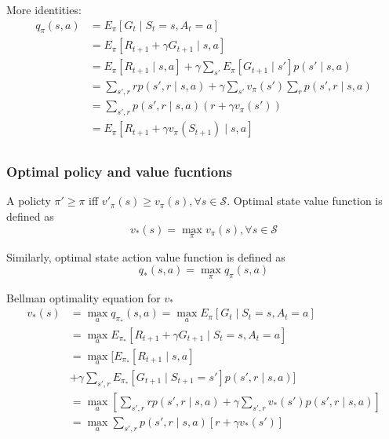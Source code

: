 \documentclass[twocolumn, 10pt]{article}
\newcommand{\stateset}{\mathcal{S}}
\begin{document}
More identities:
$$
\begin{aligned}
 q_{\pi}(s, a) &= E_{\pi} [G_t \mid S_t = s, A_t = a]  \\
 					   &= E_{\pi} [R_{t+1} + \gamma G_{t+1} \mid  s,  a] \\
                       &=   E_{\pi} [R_{t+1} \mid s, a] + \gamma \sum_{s'} E_{\pi}  [G_{t+1} \mid s'] p(s' \mid s, a) \\
                       &=  \sum_{s', r}  r p(s', r  \mid s, a) + \gamma \sum_{s' } v_{\pi}(s')   \sum_{r} p(s', r \mid s, a) \\
                       &=  \sum_{s', r} p(s', r  \mid s, a)  ( r  + \gamma  v_{\pi}(s') ) \\
                       &=   E_{\pi} [R_{t+1}  + \gamma  v_{\pi}(S_{t+1}) \mid s, a] \\
\end{aligned}
$$

\subsubsection*{Optimal policy and value fucntions}

 A policty $\pi' \geq \pi$ iff  $v'_{\pi}(s) \geq v_{\pi}(s), \forall s \in \stateset$. Optimal state value function is defined as $$v_*(s) = \max_{\pi} v_{\pi}(s),  \forall s \in \stateset$$
 
 Similarly,  optimal state action value function is defined as $$ q_*(s, a) = \max_{\pi} q_{\pi}(s, a) $$
   
 Bellman optimality equation for $v_*$  
 $$
\begin{aligned}
v_*(s) & = \max_{a} q_{\pi_*}(s, a) =\max_a E_{\pi} [G_t \mid S_t = s, A_t = a] \\
            & = \max_{a} E_{\pi_*} [R_{t+ 1} + \gamma G_{t+1} \mid S_t = s, A_t = a] \\
            & = \max_{a} [  E_{\pi_*} [R_{t+ 1}  \mid s, a ]  \\
            & + \gamma   \sum_{s', r}  E_{\pi_*} [G_{t+1}  \mid S_{t+1} = s']p(s', r \mid  s, a)]  \\
            & = \max_{a} \left[  \sum_{s', r} r p(s', r \mid s, a)   + \gamma   \sum_{s', r}  v_*(s')p(s', r \mid  s, a) \right]  \\
            & = \max_{a} \sum_{s', r} p(s', r \mid s, a) [r + \gamma v_*(s')] \\
\end{aligned}
$$
\end{document}
